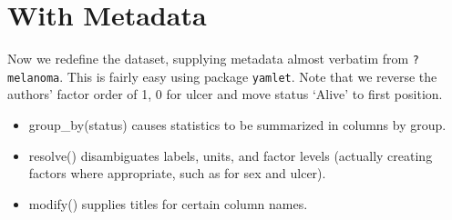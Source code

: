 \documentclass[
]{article}
\newenvironment{Shaded}{\begin{snugshade}}{\end{snugshade}}
\newcommand{\DataTypeTok}[1]{\textcolor[rgb]{0.13,0.29,0.53}{#1}}
\newcommand{\KeywordTok}[1]{\textcolor[rgb]{0.13,0.29,0.53}{\textbf{#1}}}
\newcommand{\NormalTok}[1]{#1}
\newcommand{\OperatorTok}[1]{\textcolor[rgb]{0.81,0.36,0.00}{\textbf{#1}}}
\newcommand{\StringTok}[1]{\textcolor[rgb]{0.31,0.60,0.02}{#1}}
\begin{document}
\hypertarget{with-metadata}{%
\section{With Metadata}\label{with-metadata}}

Now we redefine the dataset, supplying metadata almost verbatim from
\texttt{?melanoma}. This is fairly easy using package \texttt{yamlet}.
Note that we reverse the authors' factor order of 1, 0 for ulcer and
move status `Alive' to first position.

\begin{Shaded}
\end{Shaded}

\begin{itemize}
\item
  group\_by(status) causes statistics to be summarized in columns by
  group.
\item
  resolve() disambiguates labels, units, and factor levels (actually
  creating factors where appropriate, such as for sex and ulcer).
\item
  modify() supplies titles for certain column names.
\end{itemize}
\end{document}
